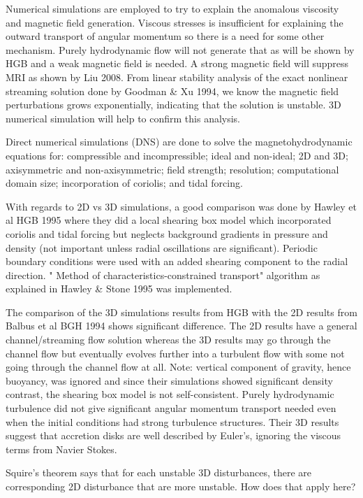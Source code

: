 \documentclass{jfm}
\begin{document}
Numerical simulations are employed to try to explain the anomalous viscosity and magnetic field generation. Viscous stresses is insufficient for explaining the outward transport of angular momentum so there is a need for some other mechanism. Purely hydrodynamic flow will not generate that as will be shown by HGB and a weak magnetic field is needed. A strong magnetic field will suppress MRI as shown by Liu 2008. From linear stability analysis of the exact nonlinear streaming solution done by Goodman \& Xu 1994, we know the magnetic field perturbations grows exponentially, indicating that the solution is unstable. 3D numerical simulation will help to confirm this analysis.

Direct numerical simulations (DNS) are done to solve the magnetohydrodynamic equations for: compressible and incompressible; ideal and non-ideal; 2D and 3D; axisymmetric and non-axisymmetric; field strength; resolution; computational domain size; incorporation of coriolis; and tidal forcing.

With regards to 2D vs 3D simulations, a good comparison was done by Hawley et al HGB 1995 where they did a local shearing box model which incorporated coriolis and tidal forcing but neglects background gradients in pressure and density (not important unless radial oscillations are significant). Periodic boundary conditions were used with an added shearing component to the radial direction. " Method of characteristics-constrained transport" algorithm as explained in Hawley \& Stone 1995 was implemented.

The comparison of the 3D simulations results from HGB with the 2D results from Balbus et al BGH 1994 shows significant difference. The 2D results have a general channel/streaming flow solution whereas the 3D results may go through the channel flow but eventually evolves further into a turbulent flow with some not going through the channel flow at all. Note: vertical component of gravity, hence buoyancy, was  ignored and since their simulations showed significant density contrast, the shearing box model is not self-consistent. Purely hydrodynamic turbulence did not give significant angular momentum transport needed even when the initial conditions had strong turbulence structures. Their 3D results suggest that accretion disks are well described by Euler's, ignoring the viscous terms from Navier Stokes.

Squire's theorem says that for each unstable 3D disturbances, there are corresponding 2D disturbance that are more unstable. How does that apply here?
\end{document}
